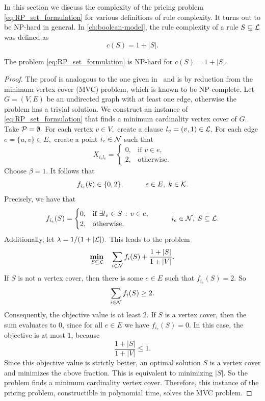 In this section we discuss the complexity of the pricing problem \eqref{eq:RP_set_formulation} for various definitions of rule complexity.
It turns out to be NP-hard in general.
In \autoref{ch:boolean-model}, the rule complexity of a rule $S \subseteq \L$ was defined as \[c(S)=1+|S|.\]
\begin{theorem}
    \cite{lawless_interpretable_2023}
    \label{thm:np-hard-lawless}
    The problem \eqref{eq:RP_set_formulation} is NP-hard for $c(S) = 1 + |S|.$
\end{theorem}

\begin{proof}
    The proof is analogous to the one given in~\cite{lawless_interpretable_2023} and is by reduction from the minimum vertex cover (MVC) problem, which is known to be NP-complete.
    Let $G=(V,E)$ be an undirected graph with at least one edge, otherwise the problem has a trivial solution.
    We construct an instance of \eqref{eq:RP_set_formulation} that finds a minimum cardinality vertex cover of $G$.
    Take $\P = \emptyset.$
    For each vertex $v \in V,$ create a clause $l_v = (v, 1) \in \L$.
    For each edge $e = \{u,v\} \in E,$ create a point $i_e \in \N$ such that
    \[X_{i_e l_v} = \begin{cases}
                        0, & \text{if $v \in e$}, \\
                        2, & \text{otherwise}.
    \end{cases}\]
    Choose $\beta = 1.$ It follows that
    \[
        f_{i_{e}}(k) \in \{0, 2\}, \tquad e \in E, \; k \in \K.
    \]
    Precisely, we have that
    \[f_{i_e}(S) = \begin{cases}
                         0, & \text{if $\exists l_v \in S \fw v \in e$,} \\
                         2, & \text{otherwise},
    \end{cases} \tquad i_e \in \N, \; S \subseteq \L.
    \]
    Additionally, let $\lambda = 1/(1 + |\L|).$
    This leads to the problem
    \[\umin{S \subseteq \L} \quad \sum\limits_{i \in \N} f_i(S) + \frac{1 + |S|}{1 + |V|}.\]
    If $S$ is not a vertex cover, then there is some $e \in E$ such that $f_{i_e}(S) = 2.$ So
    \[
        \sum\limits_{i \in \N} f_i(S) \geq 2.
    \]
    Consequently, the objective value is at least $2$.
    If $S$ is a vertex cover, then the sum evaluates to $0$, since for all $e \in E$ we have $f_{i_e}(S) = 0.$
    In this case, the objective is at most $1$, because
    \[\frac{1 + |S|}{1 + |V|} \leq 1.\]
    Since this objective value is strictly better,
    an optimal solution $S$ is a vertex cover and minimizes the above fraction.
    This is equivalent to minimizing $|S|$.
    So the problem finds a minimum cardinality vertex cover.
    Therefore, this instance of the pricing problem, constructible in polynomial time, solves the MVC problem. \qedhere
\end{proof}

